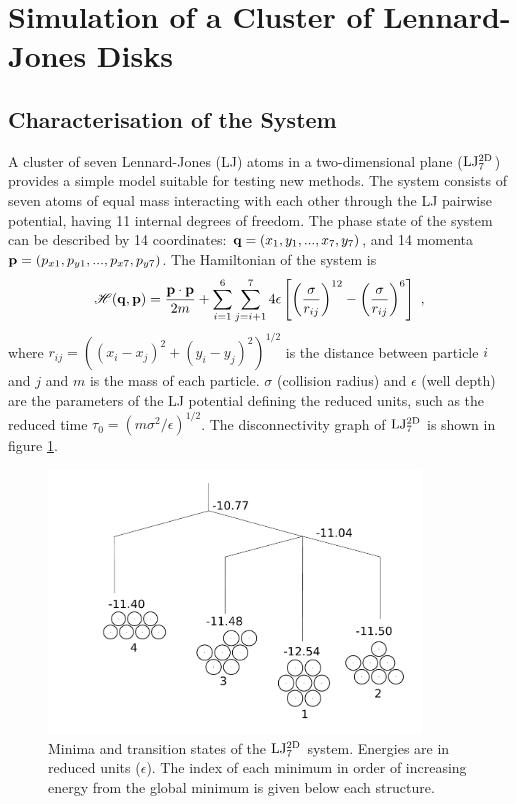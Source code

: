 \section{Simulation of a Cluster of Lennard-Jones Disks}

\subsection{Characterisation of the System}

A cluster of seven Lennard-Jones (LJ) atoms in a two-dimensional plane (${\rm LJ_7^{2D}}$) provides a simple model suitable for testing new methods.
The system consists of seven atoms of equal mass interacting with each other through the LJ pairwise \mbox{potential,\cite{Jones1925}} having 11 internal degrees of freedom.
The phase state of the system can be described by 14 coordinates: ${\bf q} = (x_1, y_1, ..., x_7, y_7)$, and 14 momenta ${\bf p} = (p_{x1}, p_{y1}, ..., p_{x7}, p_{y7})$.
The Hamiltonian of the system is
\begin{equation} 
\mathscr{H}({\bf q},{\bf p}) = \frac{{\bf p} \cdot {\bf p}}{2 m} + \sum_{i=1}^{6} \sum_{j=i+1}^7 4 \epsilon \left[ \left( \frac{\sigma}{r_{ij}} \right)^{12} - \left( \frac{\sigma}{r_{ij}} \right)^6 \right] ~,
\end{equation}
where $r_{ij} = \left( (x_i-x_j)^2+(y_i-y_j)^2 \right)^{1/2}$ is the distance between particle $i$ and $j$ and $m$ is the mass of each particle.
$\sigma$ (collision radius) and $\epsilon$ (well depth) are the parameters of the LJ potential defining the reduced units, such as the reduced time $\tau_0 = (m \sigma^2 / \epsilon)^{1/2}$.
The disconnectivity graph\cite{Becker1997, Wales2003} of ${\rm LJ_7^{2D}}$ is shown in figure \ref{fig:discon-graph}.


\begin{figure}[h]
\centering
\includegraphics[height=7cm]{Images/disconnect.pdf}
\caption[Disconnectivity graph of ${\rm LJ_7^{2D}}$]{Minima and transition states of the ${\rm LJ_7^{2D}}$ system.\cite{Wales2002, Wales2003} Energies are in reduced units ($\epsilon$). The index of each minimum in order of increasing energy from the global minimum is given below each structure.}
\label{fig:discon-graph}
\end{figure}

